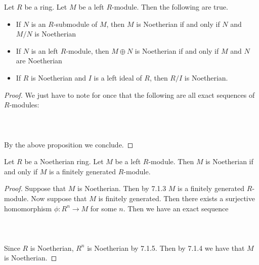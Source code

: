 \documentclass[a4paper]{article}
\begin{document}
\begin{crl}{}{} Let $R$ be a ring. Let $M$ be a left $R$-module. Then the following are true. 
\begin{itemize}
\item If $N$ is an $R$-submodule of $M$, then $M$ is Noetherian if and only if $N$ and $M/N$ is Noetherian
\item If $N$ is an left $R$-module, then $M\oplus N$ is Noetherian if and only if $M$ and $N$ are Noetherian
\item If $R$ is Noetherian and $I$ is a left ideal of $R$, then $R/I$ is Noetherian. 
\end{itemize} \tcbline
\begin{proof}
We just have to note for once that the following are all exact sequences of $R$-modules: \\~\\
\\~\\
By the above proposition we conclude. 
\end{proof}
\end{crl}

\begin{crl}{}{} Let $R$ be a Noetherian ring. Let $M$ be a left $R$-module. Then $M$ is Noetherian if and only if $M$ is a finitely generated $R$-module. \tcbline
\begin{proof}
Suppose that $M$ is Noetherian. Then by 7.1.3 $M$ is a finitely generated $R$-module. Now suppose that $M$ is finitely generated. Then there exists a surjective homomorphism $\phi:R^n\to M$ for some $n$. Then we have an exact sequence \\~\\
\\~\\
Since $R$ is Noetherian, $R^n$ is Noetherian by 7.1.5. Then by 7.1.4 we have that $M$ is Noetherian. 
\end{proof}
\end{crl}
\end{document}
